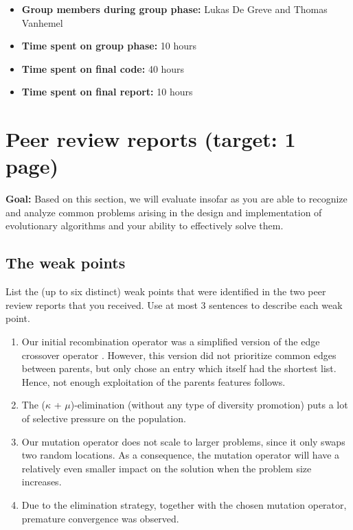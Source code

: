 \documentclass[a4paper,10pt]{article}
\newcommand{\ReplaceMe}[1]{{\color{blue}#1}}
\newcommand{\RemoveMe}[1]{{\color{purple}#1}}
\begin{document}
\begin{itemize}
 \item \textbf{Group members during group phase:} Lukas De Greve and Thomas Vanhemel
 \item \textbf{Time spent on group phase:} \ReplaceMe{10 hours} %
 \item \textbf{Time spent on final code:} \ReplaceMe{40 hours}  %
 \item \textbf{Time spent on final report:} \ReplaceMe{10 hours} %
\end{itemize}

\section{Peer review reports (target: 1 page)}


\RemoveMe{\textbf{Goal:} Based on this section, we will evaluate insofar as you are able to recognize and analyze common problems arising in the design and implementation of evolutionary algorithms and your ability to effectively solve them.}

\subsection{The weak points}
\ReplaceMe{List the (up to six distinct) weak points that were identified in the two peer review reports that you received. Use at most 3 sentences to describe each weak point.}

\begin{enumerate}
 \item Our initial recombination operator was a simplified version of the edge crossover operator \cite{initial_implementation_edge_crossover}. However, this version did not prioritize common edges between parents, but only chose an entry which itself had the shortest list. Hence, not enough exploitation of the parents features follows. 
 \item The ($\kappa$ + $\mu$)-elimination (without any type of diversity promotion) puts a lot of selective pressure on the population.
 \item Our mutation operator does not scale to larger problems, since it only swaps two random locations. As a consequence, the mutation operator will have a relatively even smaller impact on the solution when the problem size increases. 
 \item Due to the elimination strategy, together with the chosen mutation operator, premature convergence was observed.
\end{enumerate}
\end{document}
